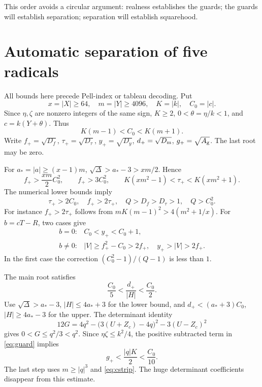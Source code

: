 \documentclass[11pt,a4paper]{article}
\theoremstyle{definition}\newtheorem{definition}[theorem]{Definition}
\theoremstyle{remark}\newtheorem{remark}[theorem]{Remark}
\newcommand{\Dm}{D_{\rm m}}\newcommand{\Dt}{D_{\tau}}
\newcommand{\Df}{D_f}\newcommand{\Dy}{D_y}\newcommand{\Ag}{A_{\rm g}}
\numberwithin{equation}{section}
\begin{document}
This order avoids a circular argument: realness establishes the guards;
the guards will establish separation; separation will establish squarehood.

\section{Automatic separation of five radicals}\label{sec:separation}

All bounds here precede Pell-index or tableau decoding. Put
\[
x=|X|\ge64,\quad m=|Y|\ge4096,\quad K=|k|,\quad C_0=|c|.
\]
Since \(\eta,\zeta\) are nonzero integers of the same sign,
\(K\ge2\), \(0<\theta=\eta/k<1\), and \(c=k(Y+\theta)\). Thus
\begin{equation}
K(m-1)<C_0<K(m+1).
\label{eq:cstrip}
\end{equation}
Write \(f_+=\sqrt{\Df}\), \(\tau_+=\sqrt{\Dt}\),
\(y_+=\sqrt{\Dy}\), \(d_+=\sqrt{\Dm}\), \(g_+=\sqrt{\Ag}\).
The last root may be zero.

For \(a_*=|a|\ge(x-1)m\),
\(\sqrt\Delta>a_*-3>xm/2\). Hence
\[
f_+>\frac{xm}{2}C_0^2,\qquad f_+>3C_0^2,\qquad
K(xm^2-1)<\tau_+<K(xm^2+1).
\]
The numerical lower bounds imply
\begin{equation}
\tau_+>2C_0,\quad f_+>2\tau_+,\quad
Q>\Df>\Dt>1,\quad Q>C_0^2.
\label{eq:gaps}
\end{equation}
For instance \(f_+>2\tau_+\) follows from
\(mK(m-1)^2>4(m^2+1/x)\).
For \(b=cT-R\), two cases give
\begin{equation}
\begin{array}{ll}
b=0:&C_0<y_+<C_0+1,\\
b\ne0:&|V|\ge f_+^2-C_0>2f_+,\quad y_+>|V|>2f_+.
\end{array}
\label{eq:ycase}
\end{equation}
In the first case the correction
\((C_0^2-1)/(Q-1)\) is less than \(1\).

The main root satisfies
\begin{equation}
\frac{C_0}{5}<\frac{d_+}{|H|}<\frac{C_0}{2}.
\label{eq:mainbound}
\end{equation}
Use \(\sqrt\Delta>a_*-3\), \(|H|\le4a_*+3\) for the lower
bound, and \(d_+<(a_*+3)C_0\), \(|H|\ge4a_*-3\) for the upper.
The determinant identity
\begin{equation}
12G=4q^2-\bigl(3(U+Z_c)-4q\bigr)^2-3(U-Z_c)^2
\label{eq:detbound}
\end{equation}
gives \(0<G\le q^2/3<q^2\). Since
\(\eta\zeta\le k^2/4\), the positive subtracted term in \eqref{eq:guard}
implies
\begin{equation}
g_+<\frac{|q|K}{2}<\frac{C_0}{10}.
\label{eq:guardbound}
\end{equation}
The last step uses \(m\ge|q|^3\) and \eqref{eq:cstrip}.
The huge determinant coefficients disappear from this estimate.
\end{document}
